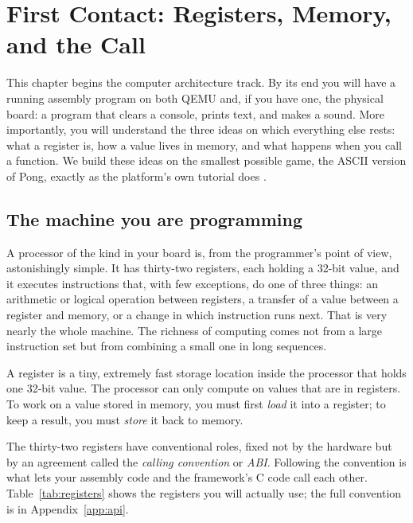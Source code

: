 \chapter{First Contact: Registers, Memory, and the Call}
\label{ch:asm1}

This chapter begins the computer architecture track. By its end you will have a
running \riscv assembly program on both QEMU and, if you have one, the physical
board: a program that clears a console, prints text, and makes a sound. More
importantly, you will understand the three ideas on which everything else rests:
what a register is, how a value lives in memory, and what happens when you call a
function. We build these ideas on the smallest possible game, the ASCII version
of Pong, exactly as the platform's own tutorial does \citep{prg32tutorialascii}.

\section{The machine you are programming}

A \riscv processor of the kind in your board is, from the programmer's point of
view, astonishingly simple. It has thirty-two registers, each holding a 32-bit
value, and it executes instructions that, with few exceptions, do one of three
things: an arithmetic or logical operation between registers, a transfer of a
value between a register and memory, or a change in which instruction runs next.
That is very nearly the whole machine. The richness of computing comes not from a
large instruction set but from combining a small one in long sequences.

\begin{prgconcept}
A register is a tiny, extremely fast storage location inside the processor that
holds one 32-bit value. The processor can only compute on values that are in
registers. To work on a value stored in memory, you must first \emph{load} it
into a register; to keep a result, you must \emph{store} it back to memory.
\end{prgconcept}

The thirty-two registers have conventional roles, fixed not by the hardware but
by an agreement called the \emph{calling convention} or \emph{ABI}. Following the
convention is what lets your assembly code and the framework's C code call each
other. Table~\ref{tab:registers} shows the registers you will actually use; the
full convention is in Appendix~\ref{app:api}.

